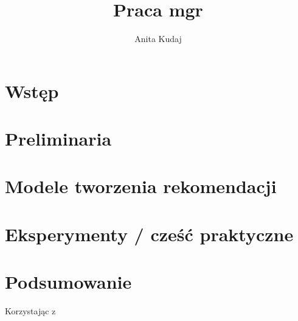\documentclass[10pt,a4paper]{report}
\author{Anita Kudaj}
\title{Praca mgr}
\begin{document}
\maketitle

\tableofcontents

\chapter{Wstęp}
\chapter{Preliminaria} %

\chapter{Modele tworzenia rekomendacji}

\chapter{Eksperymenty / cześć praktyczne}

\chapter{Podsumowanie}

Korzystając z \citep[Rozdział 3, akapit 4]{ricci2015recommender}

\nocite{*} %


\end{document}
